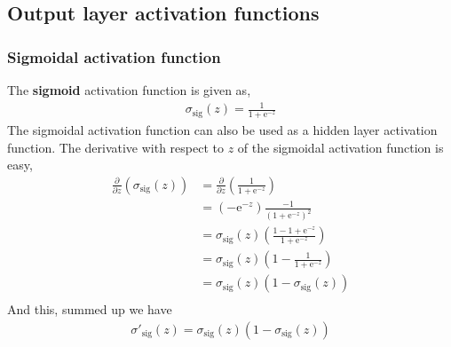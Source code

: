 \documentclass[a4paper,10pt]{article}
\newcommand{\e}[1]{\mathrm{e}^{#1}}
\begin{document}
\subsection{Output layer activation functions}
\subsubsection{Sigmoidal activation function}
The \textbf{sigmoid} activation function is given as,
\begin{align}
    \sigma_\mathrm{sig} (z) = \frac{1}{1 + \e{-z}}
    \label{eq:sigmoidal-activation}
\end{align}
The sigmoidal activation function can also be used as a hidden layer activation function. The derivative with respect to $z$ of the sigmoidal activation function is easy,
\begin{align*}
    \frac{\partial}{\partial z}(\sigma_\mathrm{sig}(z)) &= \frac{\partial}{\partial z}\left(\frac{1}{1 + \e{-z}}\right) \\
    &= (-\e{-z}) \frac{-1}{(1+\e{-z})^2} \\
    &= \sigma_\mathrm{sig}(z)\left(\frac{1 - 1 + \e{-z}}{1 + \e{-z}}\right) \\
    &= \sigma_\mathrm{sig}(z)\left(1 - \frac{1}{1 + \e{-z}}\right) \\
    &= \sigma_\mathrm{sig}(z)\left(1 - \sigma_\mathrm{sig}(z)\right) \\
\end{align*}
And this, summed up we have
\begin{align}
    \sigma'_\mathrm{sig}(z) = \sigma_\mathrm{sig}(z)(1 - \sigma_\mathrm{sig}(z))
    \label{eq:sigmoidal-activation-derivative}
\end{align}
\end{document}
